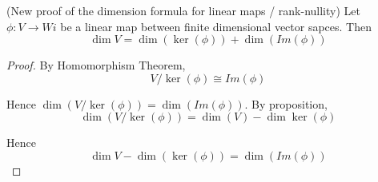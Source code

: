 \begin{corollary}
    (New proof of the dimension formula for linear maps / rank-nullity) Let $ \phi: V \to Wi$ be a linear map between finite dimensional vector sapces. Then 
    \[
    \dim V = \dim ( \ker( \phi)) + \dim ( Im ( \phi))
    \]
\end{corollary}

\begin{proof}
    By Homomorphism Theorem, 
    \[
    V / \ker(\phi) \cong Im ( \phi)
    \]

    Hence $\dim(V / \ker( \phi)) = \dim ( Im ( \phi))$. By proposition, 
    \[
        \dim( V / \ker( \phi)) = \dim(V) - \dim \ker( \phi)
    \]

    Hence 
    \[
        \dim V - \dim (\ker( \phi))  = \dim( Im( \phi))
    \]
    
    
\end{proof}








\newpage